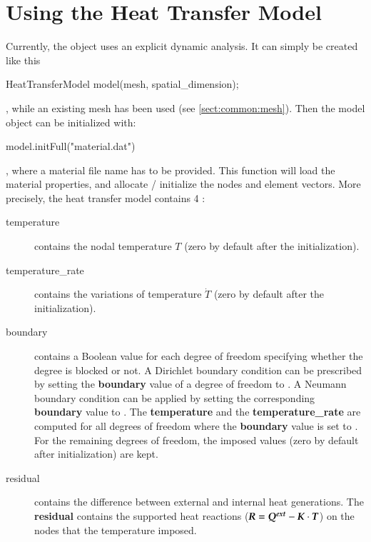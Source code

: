 \section{Using the Heat Transfer Model}
Currently, the  object uses an explicit dynamic analysis.
It can simply be created like this
\begin{cpp}
  HeatTransferModel model(mesh, spatial_dimension);
\end{cpp}
, while an existing mesh has been used (see \ref{sect:common:mesh}).
Then the model object can be initialized with:
\begin{cpp}
  model.initFull("material.dat")
\end{cpp}
, where a material file name has to be provided. This function will load the material
properties, and allocate / initialize the nodes and element vectors.
More precisely, the heat transfer model contains 4 :
\begin{description}
\item[temperature] contains the nodal temperature $T$ (zero  by   default  after  the
  initialization).
\item[temperature\_rate] contains the variations of temperature $\dot{T}$
  (zero  by   default  after  the
  initialization).

\item[boundary] contains a  Boolean value for each degree  of freedom specifying
  whether the degree  is blocked or not. A Dirichlet  boundary condition can be
  prescribed by  setting the \textbf{boundary} value  of a degree  of freedom to
  .   A Neumann  boundary condition  can  be applied  by setting  the
  corresponding     \textbf{boundary}     value     to    .      The
  \textbf{temperature} and  the \textbf{temperature\_rate} are  computed for all
  degrees  of  freedom  where  the  \textbf{boundary}  value   is  set  to
  .  For the remaining degrees  of freedom, the imposed values (zero
  by default after  initialization) are kept.

\item[residual] contains the difference between external and internal heat generations.
The \textbf{residual} contains the supported heat reactions ($\boldsymbol{R} = \boldsymbol{Q^{ext}} -\boldsymbol{K} \cdot \boldsymbol{T}$) on
  the nodes that the temperature imposed.
\end{description}


